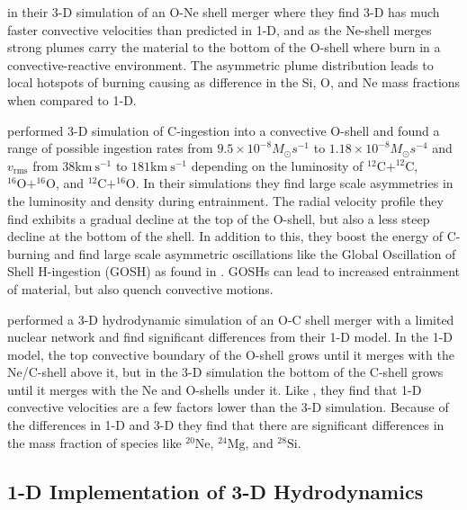 \cite{arnett3DSimulationsMLT2019} 

\cite{yadavLargescaleMixingViolent2020a} in their 3-D simulation of an O-Ne shell merger where they find 3-D has much faster convective velocities than predicted in 1-D, and as the Ne-shell merges strong plumes carry the material to the bottom of the O-shell where burn in a convective-reactive environment.
The asymmetric plume distribution leads to local hotspots of burning causing as difference in the Si, O, and Ne mass fractions when compared to 1-D.

\cite{andrassy3DHydrodynamicSimulations2020} performed 3-D simulation of C-ingestion into a convective O-shell and found a range of possible ingestion rates from $9.5\times10^{-8} M_\odot s^{-1}$ to $1.18\times10^{-8} M_\odot s^{-4}$ and $v_{\mathrm{rms}}$ from $38 \mathrm{km~s^{-1}}$ to $181 \mathrm{km~s^{-1}}$ depending on the luminosity of $^{12}\mathrm{C}+^{12}\mathrm{C}$, $^{16}\mathrm{O}+^{16}\mathrm{O}$, and $^{12}\mathrm{C}+^{16}\mathrm{O}$.
In their simulations they find large scale asymmetries in the luminosity and density during entrainment.
The radial velocity profile they find exhibits a gradual decline at the top of the O-shell, but also a less steep decline at the bottom of the shell.
In addition to this, they boost the energy of C-burning and find large scale asymmetric oscillations like the Global Oscillation of Shell H-ingestion (GOSH) as found in \cite{herwigGLOBALNONSPHERICALOSCILLATIONS2014}.
GOSHs can lead to increased entrainment of material, but also quench convective motions.

\cite{rizzutiShellMergersLate2024a} performed a 3-D hydrodynamic simulation of an O-C shell merger with a limited nuclear network and find significant differences from their 1-D model.
In the 1-D model, the top convective boundary of the O-shell grows until it merges with the Ne/C-shell above it, but in the 3-D simulation the bottom of the C-shell grows until it merges with the Ne and O-shells under it.
Like \cite{jonesIdealizedHydrodynamicSimulations2017}, they find that 1-D convective velocities are a few factors lower than the 3-D simulation.
Because of the differences in 1-D and 3-D they find that there are significant differences in the mass fraction of species like $^{20}\mathrm{Ne}$, $^{24}\mathrm{Mg}$, and $^{28}\mathrm{Si}$.

\subsection{1-D Implementation of 3-D Hydrodynamics}\label{sec:intro_1dimplementof3d}

